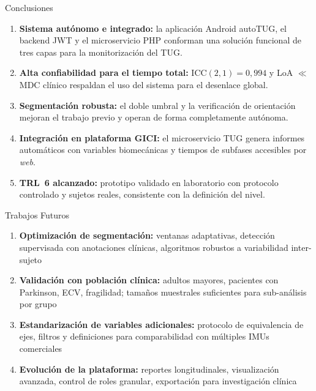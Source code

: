 \documentclass[10pt,aspectratio=169]{beamer}
\begin{document}
\begin{frame}{Conclusiones}
  \begin{enumerate}
    \setlength{\itemsep}{0.55em}
    \item \textbf{Sistema autónomo e integrado:} la aplicación
          Android autoTUG, el backend JWT y el microservicio PHP
          conforman una solución funcional de tres capas para la
          monitorización del TUG.

    \item \textbf{Alta confiabilidad para el tiempo total:}
          ICC$(2,1) = 0{,}994$ y LoA $\ll$ MDC clínico respaldan el
          uso del sistema para el desenlace global.

    \item \textbf{Segmentación robusta:} el doble umbral y la
          verificación de orientación mejoran el trabajo previo y
          operan de forma completamente autónoma.

    \item \textbf{Integración en plataforma GICI:} el microservicio
          TUG genera informes automáticos con variables biomecánicas
          y tiempos de subfases accesibles por \textit{web}.

    \item \textbf{TRL~6 alcanzado:} prototipo validado en
          laboratorio con protocolo controlado y sujetos reales,
          consistente con la definición del nivel.
  \end{enumerate}
\end{frame}

\begin{frame}{Trabajos Futuros}
  \begin{enumerate}
    \setlength{\itemsep}{0.6em}
    \item \textbf{Optimización de segmentación:} ventanas
          adaptativas, detección supervisada con anotaciones
          clínicas, algoritmos robustos a variabilidad inter-sujeto

    \item \textbf{Validación con población clínica:} adultos
          mayores, pacientes con Parkinson, ECV, fragilidad; tamaños
          muestrales suficientes para sub-análisis por grupo

    \item \textbf{Estandarización de variables adicionales:}
          protocolo de equivalencia de ejes, filtros y definiciones
          para comparabilidad con múltiples IMUs comerciales

    \item \textbf{Evolución de la plataforma:} reportes
          longitudinales, visualización avanzada, control de roles
          granular, exportación para investigación clínica
  \end{enumerate}
\end{frame}
\end{document}
